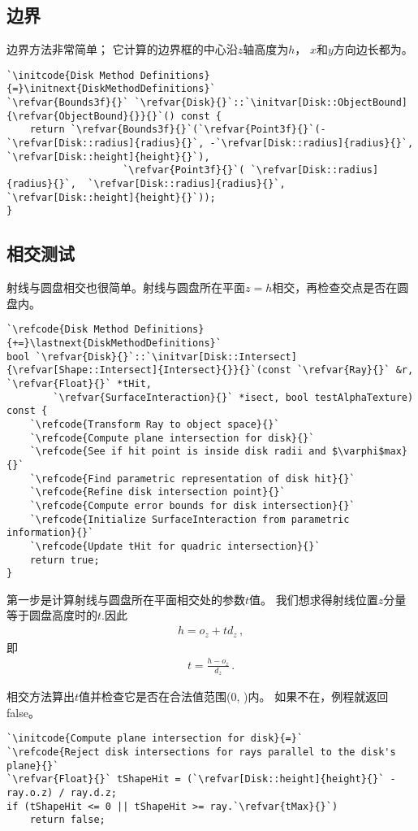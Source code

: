 \subsection{边界}\label{sub:边界4}
边界方法非常简单；
它计算的边界框的中心沿$z$轴高度为$h$，
$x$和$y$方向边长都为。
\begin{lstlisting}
`\initcode{Disk Method Definitions}{=}\initnext{DiskMethodDefinitions}`
`\refvar{Bounds3f}{}` `\refvar{Disk}{}`::`\initvar[Disk::ObjectBound]{\refvar{ObjectBound}{}}{}`() const {
    return `\refvar{Bounds3f}{}`(`\refvar{Point3f}{}`(-`\refvar[Disk::radius]{radius}{}`, -`\refvar[Disk::radius]{radius}{}`, `\refvar[Disk::height]{height}{}`),
                    `\refvar{Point3f}{}`( `\refvar[Disk::radius]{radius}{}`,  `\refvar[Disk::radius]{radius}{}`, `\refvar[Disk::height]{height}{}`));
}
\end{lstlisting}

\subsection{相交测试}\label{sub:相交测试4}
射线与圆盘相交也很简单。射线与圆盘所在平面$z=h$相交，再检查交点是否在圆盘内。
\begin{lstlisting}
`\refcode{Disk Method Definitions}{+=}\lastnext{DiskMethodDefinitions}`
bool `\refvar{Disk}{}`::`\initvar[Disk::Intersect]{\refvar[Shape::Intersect]{Intersect}{}}{}`(const `\refvar{Ray}{}` &r, `\refvar{Float}{}` *tHit,
        `\refvar{SurfaceInteraction}{}` *isect, bool testAlphaTexture) const {
    `\refcode{Transform Ray to object space}{}`
    `\refcode{Compute plane intersection for disk}{}`
    `\refcode{See if hit point is inside disk radii and $\varphi$max}{}`
    `\refcode{Find parametric representation of disk hit}{}`
    `\refcode{Refine disk intersection point}{}`
    `\refcode{Compute error bounds for disk intersection}{}`
    `\refcode{Initialize SurfaceInteraction from parametric information}{}`
    `\refcode{Update tHit for quadric intersection}{}`
    return true;
}
\end{lstlisting}

第一步是计算射线与圆盘所在平面相交处的参数$t$值。
我们想求得射线位置$z$分量等于圆盘高度时的$t$.因此
\begin{align*}
    h=o_z+td_z\, ,
\end{align*}
即
\begin{align*}
    t=\frac{h-o_z}{d_z}\, .
\end{align*}

相交方法算出$t$值并检查它是否在合法值范围{\ttfamily (0, )}内。
如果不在，例程就返回{\ttfamily false}。
\begin{lstlisting}
`\initcode{Compute plane intersection for disk}{=}`
`\refcode{Reject disk intersections for rays parallel to the disk's plane}{}`
`\refvar{Float}{}` tShapeHit = (`\refvar[Disk::height]{height}{}` - ray.o.z) / ray.d.z;
if (tShapeHit <= 0 || tShapeHit >= ray.`\refvar{tMax}{}`)
    return false;
\end{lstlisting}

